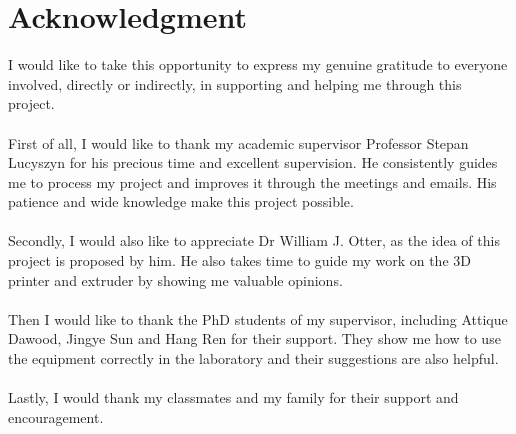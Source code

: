 \renewcommand{\baselinestretch}{1.5}
\chapter{Acknowledgment}
\renewcommand{\baselinestretch}{\mystretch}


I would like to take this opportunity to express my genuine gratitude to everyone involved, directly or indirectly, in supporting and helping me through this project.\\
\\
First of all, I would like to thank my academic supervisor Professor Stepan Lucyszyn for his precious time and excellent supervision. He consistently guides me to process my project and improves it through the meetings and emails. His patience and wide knowledge make this project possible.\\
\\
Secondly, I would also like to appreciate Dr William J. Otter, as the idea of this project is proposed by him. He also  takes time to guide my work on the 3D printer and extruder by showing me valuable opinions.\\
\\
Then I would like to thank the PhD students of my supervisor, including Attique Dawood, Jingye Sun and Hang Ren for their support. They show me how to use the equipment correctly in the laboratory and their suggestions are also helpful. \\
\\
Lastly, I would thank my classmates and my family for their support and encouragement.






